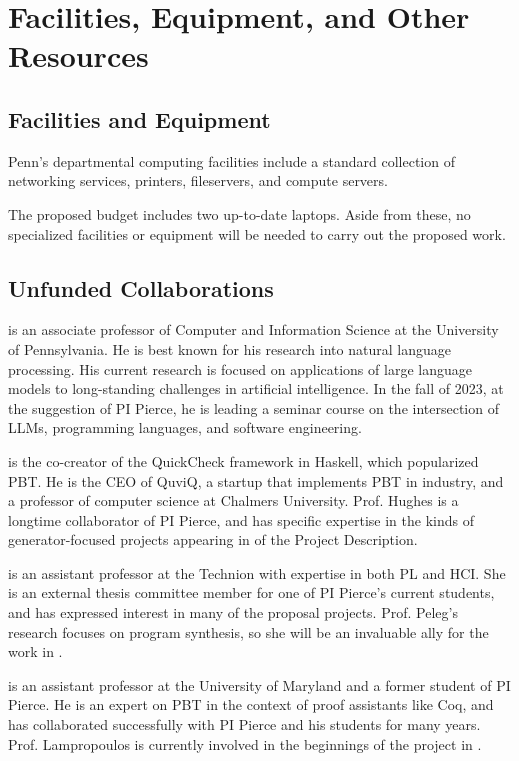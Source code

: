 \section*{Facilities, Equipment, and Other Resources}

\subsection*{Facilities and Equipment}

Penn's departmental computing facilities include a standard collection of
networking services, printers, fileservers, and compute servers.

The proposed budget includes two up-to-date laptops.  Aside from
these,
no specialized facilities or equipment will be needed to carry
out the proposed work.

\subsection*{Unfunded Collaborations}

 is an associate professor of
Computer and Information Science at the University of Pennsylvania.
%
He is best known for his research into natural language
processing. His current research is focused on applications of large
language models to long-standing challenges in artificial
intelligence. In the fall of 2023, at the suggestion of PI Pierce, he
is leading a seminar course on the intersection of LLMs, programming
languages, and software engineering.

 is the co-creator of the QuickCheck framework in
Haskell, which popularized PBT. He is the CEO of QuviQ, a startup that
implements PBT in industry, and a professor of computer science at Chalmers
University.  Prof. Hughes is a longtime collaborator of PI
Pierce, and has specific expertise in the kinds of generator-focused projects
appearing in  of the Project Description.

\smallskip{} is an assistant professor at the Technion with expertise in both
PL and HCI. She is an external thesis committee member for one of PI Pierce's current
students, and has expressed interest in many of the proposal
projects. Prof. Peleg's research
focuses on program synthesis, so she will be an invaluable ally for the work in
.

\smallskip{} is an assistant professor at the
University of Maryland and a former student of PI Pierce.  He is an expert on
PBT in the context of proof assistants like Coq, and has collaborated
successfully with PI Pierce and his students for many years. Prof. Lampropoulos
is currently involved in the beginnings of the project in
.

